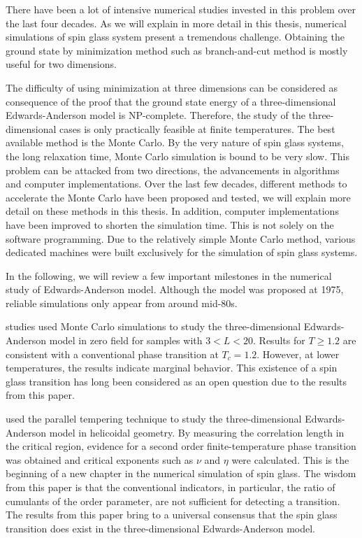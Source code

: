 There have been a lot of intensive numerical studies invested in this problem over 
the last four decades. As we will explain in more detail in this thesis, numerical
simulations of spin glass system present a tremendous challenge. Obtaining the ground
state by minimization method such as branch-and-cut method is mostly useful for 
two dimensions. 

The difficulty of using minimization at three dimensions can be 
considered as consequence of the proof that the ground state energy of a three-dimensional
Edwards-Anderson model is NP-complete. Therefore, the study of the three-dimensional
cases is only practically feasible at finite temperatures. The best available method
is the Monte Carlo. By the very nature of spin glass systems, the long relaxation time, 
Monte Carlo simulation is bound to be very slow. This problem can be attacked from 
two directions, the advancements in algorithms and computer implementations. 
Over the last few decades, different methods to accelerate the Monte Carlo 
have been proposed and tested, we will explain more detail on these methods in this thesis. 
In addition, computer implementations have been improved to shorten the simulation
time. This is not solely on the software programming. Due to the relatively 
simple Monte Carlo method, various dedicated machines were built exclusively for the simulation
of spin glass systems. 

In the following, we will review a few important milestones in the numerical study of
Edwards-Anderson model. Although the model was proposed at 1975, reliable simulations
only appear from around mid-80s.

\citet{Bhatt-Young-1985} studies used Monte Carlo simulations to study the three-dimensional
Edwards-Anderson model in zero field for samples with $3<L<20$. Results for 
$T\ge1.2$ are consistent with a conventional phase transition at $T_c=1.2$.
However, at lower temperatures, the results indicate marginal behavior. This existence
of a spin glass transition has long been considered as an open question due to the
results from this paper. 

\citet{PhysRevB.62.14237} used the parallel tempering technique to study the three-dimensional
Edwards-Anderson model in helicoidal geometry. By measuring the correlation length
in the critical region,  evidence for a second order finite-temperature phase 
transition was obtained and critical exponents such as $\nu$ and $\eta$ were 
calculated. This is the beginning of a new chapter in the numerical simulation 
of spin glass. The wisdom from this paper is that the conventional indicators,
in particular, the ratio of cumulants of the order parameter, are not sufficient 
for detecting a transition. The results from this paper bring to a universal
consensus that the spin glass transition does exist in the three-dimensional
Edwards-Anderson model.

